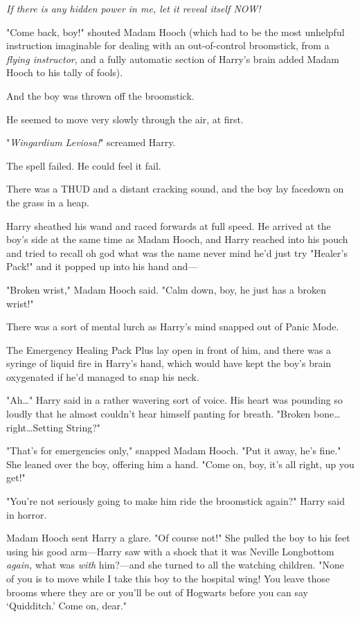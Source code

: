 \emph{If there is any hidden power in me, let it reveal itself NOW!}

"Come back, boy!" shouted Madam Hooch (which had to be the most unhelpful
instruction imaginable for dealing with an out-of-control broomstick, from a
\emph{flying instructor}, and a fully automatic section of Harry’s brain added
Madam Hooch to his tally of fools).

And the boy was thrown off the broomstick.

He seemed to move very slowly through the air, at first.

"\emph{Wingardium Leviosa!}" screamed Harry.

The spell failed. He could feel it fail.

There was a THUD and a distant cracking sound, and the boy lay facedown on the
grass in a heap.

Harry sheathed his wand and raced forwards at full speed. He arrived at the
boy’s side at the same time as Madam Hooch, and Harry reached into his pouch
and tried to recall oh god what was the name never mind he’d just try "Healer’s
Pack!" and it popped up into his hand and—

"Broken wrist," Madam Hooch said. "Calm down, boy, he just has a broken wrist!"

There was a sort of mental lurch as Harry’s mind snapped out of Panic Mode.

The Emergency Healing Pack Plus lay open in front of him, and there was a
syringe of liquid fire in Harry’s hand, which would have kept the boy’s brain
oxygenated if he’d managed to snap his neck.

"Ah…" Harry said in a rather wavering sort of voice. His heart was
pounding so loudly that he almost couldn’t hear himself panting for breath.
"Broken bone…right…Setting String?"

"That’s for emergencies only," snapped Madam Hooch. "Put it away, he’s fine."
She leaned over the boy, offering him a hand. "Come on, boy, it’s all right, up
you get!"

"You’re not seriously going to make him ride the broomstick again?" Harry said
in horror.

Madam Hooch sent Harry a glare. "Of course not!" She pulled the boy to his feet
using his good arm—Harry saw with a shock that it was Neville Longbottom
\emph{again,} what was \emph{with} him?—and she turned to all the watching
children. "None of you is to move while I take this boy to the hospital wing!
You leave those brooms where they are or you’ll be out of Hogwarts before you
can say ‘Quidditch.’ Come on, dear."

